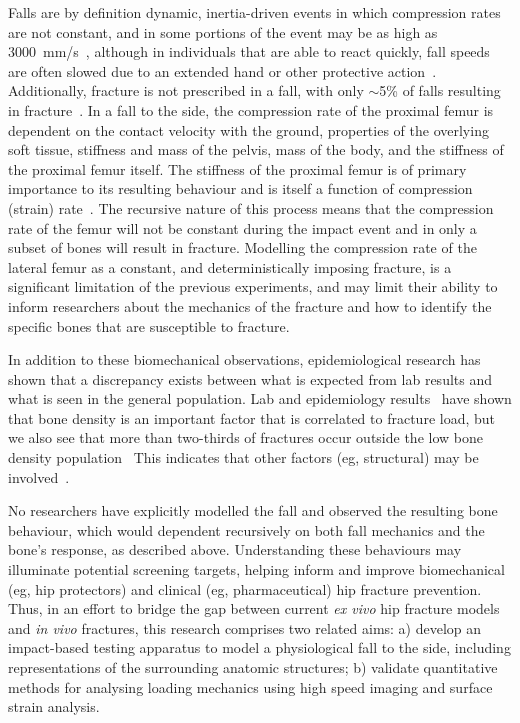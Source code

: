 Falls are by definition dynamic, inertia-driven events in which compression rates are not constant, and in some portions of the event may be as high as 3000~\ac{mm}/\ac{s}~\citep{feldman_reducing_2007}, although in individuals that are able to react quickly, fall speeds are often slowed due to an extended hand or other protective action~\citep{van_den_kroonenberg_dynamic_1995, feldman_reducing_2007}.
Additionally, fracture is not prescribed in a fall, with only $ \sim $5\% of falls resulting in fracture~\citep{nachreiner_circumstances_2007}.
In a fall to the side, the compression rate of the proximal femur is dependent on the contact velocity with the ground, properties of the overlying soft tissue, stiffness and mass of the pelvis, mass of the body, and the stiffness of the proximal femur itself.
The stiffness of the proximal femur is of primary importance to its resulting behaviour and is itself a function of compression (strain) rate~\citep{mcelhaney_dynamic_1966, crowninshield_response_1974, saha_instrumented_1974, currey_effects_1975, carter_bone_1976, robertson_compressive_1978, linde_mechanical_1991, courtney_effects_1994, pithioux_comparison_2004, hansen_effect_2008, zioupos_microcracking_2008, weber_proximal_1992}.
The recursive nature of this process means that the compression rate of the femur will not be constant during the impact event and in only a subset of bones will result in fracture.
Modelling the compression rate of the lateral femur as a constant, and deterministically imposing fracture, is a significant limitation of the previous experiments, and may limit their ability to inform researchers about the mechanics of the fracture and how to identify the specific bones that are susceptible to fracture.

In addition to these biomechanical observations, epidemiological research has shown that a discrepancy exists between what is expected from lab results and what is seen in the general population.
Lab and epidemiology results~\citep{borissova_femoral_2011, cauley_risk_2009} have shown that bone density is an important factor that is correlated to fracture load, but we also see that more than two-thirds of fractures occur outside the low bone density population~\citep{stone_bmd_2003, siris_bone_2004, greenspan_fall_1994}
This indicates that other factors (\ac{eg}, structural) may be involved~\citep{singh_changes_1970, naylor_use_2012, bouxsein_bone_2003}.

No researchers have explicitly modelled the fall and observed the resulting bone behaviour, which would dependent recursively on both fall mechanics and the bone's response, as described above.
Understanding these behaviours may illuminate potential screening targets, helping inform and improve biomechanical (\ac{eg}, hip protectors) and clinical (\ac{eg}, pharmaceutical) hip fracture prevention.
Thus, in an effort to bridge the gap between current \textit{ex vivo} hip fracture models and \textit{in vivo} fractures, this research comprises two related aims: a) develop an impact-based testing apparatus to model a physiological fall to the side, including representations of the surrounding anatomic structures; b) validate quantitative methods for analysing loading mechanics using high speed imaging and surface strain analysis.

